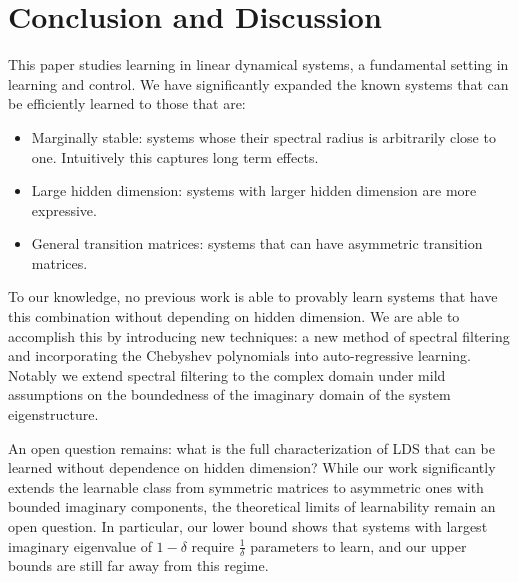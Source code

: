 \section{Conclusion and Discussion}

This paper studies learning in linear dynamical systems, a fundamental setting in learning and control. We have significantly expanded the known systems that can be efficiently learned to those that are:
\begin{itemize}
    \item Marginally stable: systems whose  their spectral radius is arbitrarily close to one. Intuitively this captures long term effects. 
    \item Large hidden dimension: systems with larger hidden dimension are more expressive. 
    \item General transition matrices: systems that can have asymmetric transition matrices. 
    \end{itemize}

To our knowledge, no previous work is able to provably learn systems that have this combination without depending on hidden dimension. We are able to accomplish this by introducing new techniques: a new method of spectral filtering and incorporating the Chebyshev polynomials into  auto-regressive learning. Notably we extend spectral filtering to the complex domain under mild assumptions on the boundedness of the imaginary domain of the system eigenstructure. 

An open question remains: what is the full characterization of LDS that can be learned without dependence on hidden dimension? While our work significantly extends the learnable class from symmetric matrices to asymmetric ones with bounded imaginary components, the theoretical limits of learnability remain an open question. In particular, our lower bound shows that systems with largest imaginary eigenvalue of $1-\delta$ require $\frac{1}{\delta}$ parameters to learn, and our upper bounds are still far away from this regime. 
